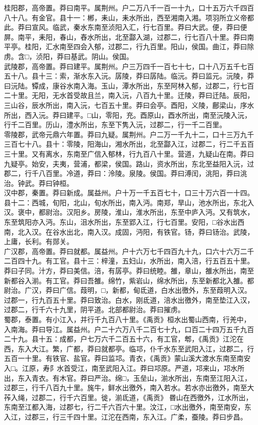 \documentclass[]{article}
\begin{document}
桂阳郡，高帝置。莽曰南平。属荆州。户二万八千一百一十九，口十五万六千四百八十八。有金官。县十一：郴，耒山，耒水所出，西至湘南入湘。项羽所立义帝都此。莽曰宣风。临武，秦水东南至浈阳入汇，行七百里。莽曰大武。便，莽曰便屏。南平，耒阳，春山，舂水所出，北至酃入湖，过郡二，行七百八十里。莽曰南平亭。桂阳，汇水南至四会入郁，过郡二，行九百里。阳山，侯国。曲江，莽曰除虏。含□，浈阳，莽曰基武。阴山。侯国。\\
武陵郡，高帝置。莽曰建平。属荆州。户三万四千一百七十七，口十八万五千七百五十八。县十三：索，渐水东入沅。孱陵，莽曰孱陆。临沅。莽曰监元。沅陵，莽曰沅陆。镡成，康谷水南入海。玉山，潭水所出，东至阿林入郁，过郡二，行七百二十里。无阳，无水首受故且兰，南入沅，八百九十里。迁陵，莽曰迁陆。辰阳，三山谷，辰水所出，南入沅，七百五十里。莽曰会亭。酉阳，义陵，鄜梁山，序水所出，西入沅。莽曰建平。□山，零阳，充。酉原山，酉水所出，南至沅陵入沅，行千二百里。历山，澧水所出，东至下隽入沅，过郡二，行一千二百里。\\
零陵郡，武帝元鼎六年置。莽曰九疑。属荆州。户二万一千九十二，口十三万九千三百七十八。县十：零陵，阳海山，湘水所出，北至酃入江，过郡二，行二千五百三十里。又有离水，东南至广信入郁林，行九百八十里。营道，九疑山在南。莽曰九疑亭。始安，夫夷，营浦，都梁，侯国。路山，资水所出，东北至益阳入沅，过郡二，行千八百里。冷道，莽曰：泠陵。泉陵。侯国。莽曰溥闰，洮阳，莽曰洮治。钟武。莽曰钟桓。\\
汉中郡，秦置。莽曰新成。属益州。户十万一千五百七十，口三十万六百一十四。县十二：西城，旬阳，北山，旬水所出，南入沔。南郑，旱山，池水所出，东北入汉。褒中，都尉治。汉阳乡。房陵，淮山，淮水所出，东至中庐入沔。又有筑水，东至筑阳亦入沔。东山，沮水所出，东至郢入江，行七百里。安阳，□谷水出西南，北入汉。在谷水出北，南入汉。成固，沔阳，有铁官。钖，莽曰钖治。武陵，上庸，长利。有郧关。\\
广汉郡，高帝置。莽曰就都。属益州。户十六万七千四百九十九，口六十六万二千二百四十九。有工官。县十三：梓潼，五妇山，水所出，南入涪，行五百五十里。莽曰子同。汁方，莽曰美信。涪，有孱亭。莽曰统睦。雒，章山，雒水所出，南至新都谷入湔。有工官。莽曰吾雒。绵竹，紫岩山，绵水所出，东至新都北入雒。都尉治。广汉，莽曰广信。葭明，□，新都，甸氐道，白水出徼外，东至葭明入汉。过郡一，行九百五十里。莽曰致治。白水，刚氐道，涪水出徼外，南至垫江入汉，过郡二，行千六十九里，阴平道。北部都尉治。莽曰摧虏。\\
蜀郡，泰置。有小江入，并行千九百八十里。《禹贡》桓水出蜀山西南，行羌中，入南海。莽曰导江。属益州。户二十六万八千二百七十九，口百二十四万五千九百二十九。县十五：成都，户七万六千二百五十六，有工官，郫，《禹贡》江沱在西，东入大江。繁，广都，莽曰就都亭。临邛，仆千水东至武阳入江，过郡二，行五百一十里。有铁官、盐官。莽曰监邛。青衣，《禹贡》蒙山溪大渡水东南至南安入□。江原，寿阝水首受江，南至武阳入江。莽曰邛原。严道，邛来山，邛水所出，东入青衣。有木官。莽曰严治。绵□，玉垒山，湔水所出，东南至江阳入江，过郡三，行千八百九十里。旄牛，鲜水出徼外，南入若水。若水亦出徼外，南至大莋入绳，过郡二，行千六百里。徙，湔氐道，《禹贡》昬山在西徼外，江水所出，东南至江都入海，过郡七，行二千六百六十里。汶江，□水出徼外，南至南安，东入江，过郡三，行三千四十里。江沱在西南，东入江。广柔，蚕陵。莽曰步昌。\\
\end{document}
